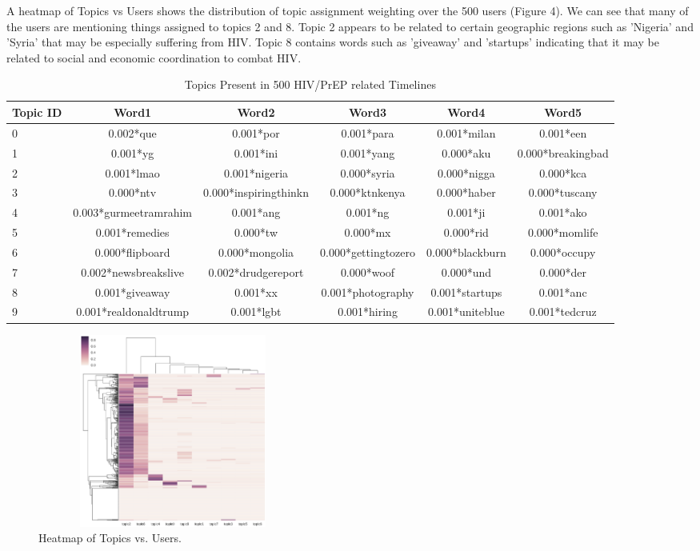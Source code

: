 \documentclass{sig-alternate-05-2015}
\begin{document}
A heatmap of Topics vs Users shows the distribution of topic assignment weighting over the 500 users (Figure 4). We can see that many of the users are mentioning things assigned to topics 2 and 8. Topic 2 appears to be related to certain geographic regions such as 'Nigeria' and 'Syria' that may be especially suffering from HIV. Topic 8 contains words such as 'giveaway' and 'startups' indicating that it may be related to social and economic coordination to combat HIV.

\begin{table}
\centering
\caption{Topics Present in 500 HIV/PrEP related Timelines}
\begin{tabular}{|l|c|c|c|c|c|} \hline
Topic ID & Word1 & Word2 & Word3 & Word4 & Word5\\ \hline
0 & 0.002*que & 0.001*por & 0.001*para & 0.001*milan & 0.001*een\\ \hline
1 & 0.001*yg & 0.001*ini & 0.001*yang & 0.000*aku & 0.000*breakingbad\\ \hline
2 & 0.001*lmao & 0.001*nigeria & 0.000*syria & 0.000*nigga & 0.000*kca\\ \hline
3 & 0.000*ntv & 0.000*inspiringthinkn & 0.000*ktnkenya & 0.000*haber & 0.000*tuscany\\ \hline
4 & 0.003*gurmeetramrahim & 0.001*ang & 0.001*ng & 0.001*ji & 0.001*ako\\ \hline
5 & 0.001*remedies & 0.000*tw & 0.000*mx & 0.000*rid & 0.000*momlife\\ \hline
6 & 0.000*flipboard & 0.000*mongolia & 0.000*gettingtozero & 0.000*blackburn & 0.000*occupy\\ \hline
7 & 0.002*newsbreakslive & 0.002*drudgereport & 0.000*woof & 0.000*und & 0.000*der\\ \hline
8 & 0.001*giveaway & 0.001*xx & 0.001*photography & 0.001*startups & 0.001*anc\\ \hline
9 & 0.001*realdonaldtrump & 0.001*lgbt & 0.001*hiring & 0.001*uniteblue & 0.001*tedcruz\\ \hline
\hline\end{tabular}
\end{table}

\begin{figure}
\centering
\includegraphics[height=2.5in, width=3.5in]{user_time}
\caption{Heatmap of Topics vs. Users.}
\end{figure}
\end{document}
